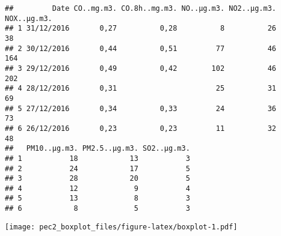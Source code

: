 \documentclass[
]{article}
\newenvironment{Shaded}{\begin{snugshade}}{\end{snugshade}}
\newcommand{\FunctionTok}[1]{\textcolor[rgb]{0.00,0.00,0.00}{#1}}
\newcommand{\NormalTok}[1]{#1}
\newcommand{\SpecialCharTok}[1]{\textcolor[rgb]{0.00,0.00,0.00}{#1}}
\begin{document}
\begin{verbatim}
##         Date CO..mg.m3. CO.8h..mg.m3. NO..µg.m3. NO2..µg.m3. NOX..µg.m3.
## 1 31/12/2016       0,27          0,28          8          26          38
## 2 30/12/2016       0,44          0,51         77          46         164
## 3 29/12/2016       0,49          0,42        102          46         202
## 4 28/12/2016       0,31                       25          31          69
## 5 27/12/2016       0,34          0,33         24          36          73
## 6 26/12/2016       0,23          0,23         11          32          48
##   PM10..µg.m3. PM2.5..µg.m3. SO2..µg.m3.
## 1           18            13           3
## 2           24            17           5
## 3           28            20           5
## 4           12             9           4
## 5           13             8           3
## 6            8             5           3
\end{verbatim}

\begin{Shaded}
\end{Shaded}

\texttt{[image: pec2\_boxplot\_files/figure-latex/boxplot-1.pdf]}
\end{document}
